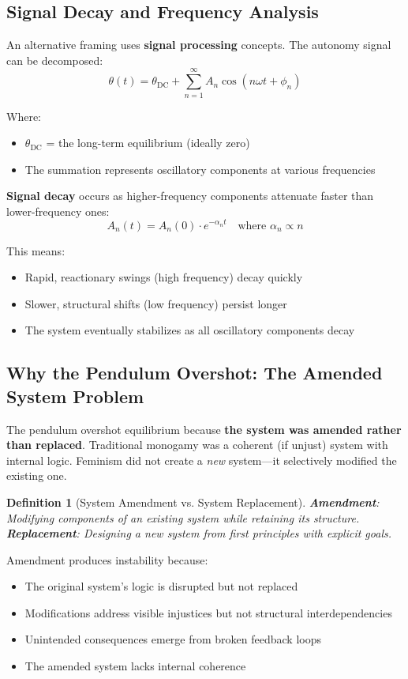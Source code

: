 \documentclass[12pt,openany]{book}
\newtheorem{definition}{Definition}[chapter]
\numberwithin{equation}{chapter}
\begin{document}
\subsection{Signal Decay and Frequency Analysis}

An alternative framing uses \textbf{signal processing} concepts. The autonomy signal can be decomposed:
\[
\theta(t) = \theta_{\text{DC}} + \sum_{n=1}^{\infty} A_n \cos(n\omega t + \phi_n)
\]

Where:
\begin{itemize}
    \item $\theta_{\text{DC}}$ = the long-term equilibrium (ideally zero)
    \item The summation represents oscillatory components at various frequencies
\end{itemize}

\textbf{Signal decay} occurs as higher-frequency components attenuate faster than lower-frequency ones:
\[
A_n(t) = A_n(0) \cdot e^{-\alpha_n t} \quad \text{where } \alpha_n \propto n
\]

This means:
\begin{itemize}
    \item Rapid, reactionary swings (high frequency) decay quickly
    \item Slower, structural shifts (low frequency) persist longer
    \item The system eventually stabilizes as all oscillatory components decay
\end{itemize}

\subsection{Why the Pendulum Overshot: The Amended System Problem}

The pendulum overshot equilibrium because \textbf{the system was amended rather than replaced}. Traditional monogamy was a coherent (if unjust) system with internal logic. Feminism did not create a \textit{new} system---it selectively modified the existing one.

\begin{definition}[System Amendment vs. System Replacement]
\textbf{Amendment}: Modifying components of an existing system while retaining its structure.\\
\textbf{Replacement}: Designing a new system from first principles with explicit goals.
\end{definition}

Amendment produces instability because:
\begin{itemize}
    \item The original system's logic is disrupted but not replaced
    \item Modifications address visible injustices but not structural interdependencies
    \item Unintended consequences emerge from broken feedback loops
    \item The amended system lacks internal coherence
\end{itemize}
\end{document}
